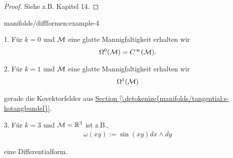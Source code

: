 \begin{proof}
 Siehe z.B. \cite{Lee03} Kapitel 14.
\end{proof}
\begin{example}{}{manifolds/diffformen:example-4}



\par
1. Für \(k=0\) und \(\mathcal{M}\) eine glatte Mannigfaltigkeit erhalten wir
\begin{align*}
\Omega^0(\mathcal{M}) = C^\infty(\mathcal{M}).
\end{align*}


\par
2. Für \(k=1\) und \(\mathcal{M}\) eine glatte Mannigfaltigkeit erhalten wir
\begin{align*}
\Omega^1(\mathcal{M})
\end{align*}
\par
gerade die Kovektorfelder aus \hyperref[\detokenize{manifolds/tangential:s-kotangbundel}]{Section \ref{\detokenize{manifolds/tangential:s-kotangbundel}}}.



\par
3. Für \(k=3\) und \(\mathcal{M}=\mathbb{R}^3\) ist z.B.,
\begin{align*}
\omega(xy) := \sin(xy) dx\wedge dy
\end{align*}
\par
eine Differentialform.
\end{example}


